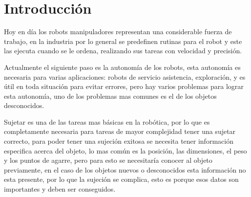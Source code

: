\chapter{Introducción}\label{intro}




Hoy en día los robots manipuladores representan una considerable fuerza de trabajo, en la industria por lo general se predefinen rutinas para el robot y este las ejecuta cuando se le ordena, realizando sus tareas con velocidad y precisión.

Actualmente el siguiente paso es la autonomía de los robots, esta autonomía es necesaria para varias aplicaciones: robots de servicio asistencia, exploración, y es útil en toda situación para evitar errores, pero hay varios problemas para lograr esta autonomía, %
uno de los problemas mas comunes es el de los objetos desconocidos.

Sujetar es una de las tareas mas básicas en la robótica, por lo que es completamente necesaria para tareas de mayor complejidad tener una sujetar correcto, para poder tener una sujeción exitosa se necesita tener información especifica acerca del objeto, lo mas común es la posición, las dimensiones, el peso y los puntos de agarre, pero para esto se necesitaría conocer al objeto previamente, en el caso de los objetos nuevos o desconocidos esta información no esta presente, por lo que la sujeción se complica, esto es porque esos datos son importantes y deben ser conseguidos.


